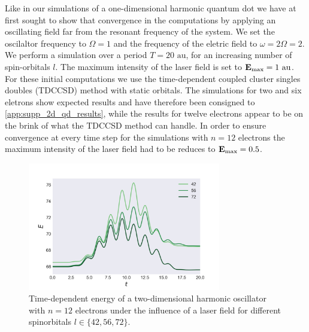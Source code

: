 Like in our simulations of a one-dimensional harmonic quantum dot we have at first 
sought to show that convergence in the computations by applying an oscillating 
field far from the resonant frequency of the system. We set the oscilaltor frequency 
to $\Omega=1$ and the frequency of the eletric field to $\omega=2\Omega=2$. We 
perform a simulation over a period $T = 20 \text{ au}$, for an increasing 
number of spin-orbitals $l$. The maximum intensity of the laser field is set to 
$\vb{E}_\text{max} = 1 \text{ au}$. For these initial computations we use the 
time-dependent coupled cluster singles doubles (TDCCSD) method with static 
orbitals. The simulations for two and six eletrons show expected results and have
therefore been consigned to \autoref{app:supp_2d_qd_results}, while the results for
twelve electrons appear to be on the brink of what the TDCCSD method 
can handle. In order to ensure convergence at every time step for the simulations 
with $n=12$ electrons the maximum intensity of the laser field had to be reduces to 
$\vb{E}_\text{max} = 0.5$.

\begin{figure}
    \centering
    \includegraphics[width=0.75\textwidth]{results/figures/2D/n12_energy.png} 
    \caption{Time-dependent energy of a two-dimensional harmonic oscillator 
        with $n=12$ electrons under the influence of a laser field for different 
        spinorbitals $l\in\{42,56,72\}$.
    }
    \label{fig:n12_2d_energy}
\end{figure}

